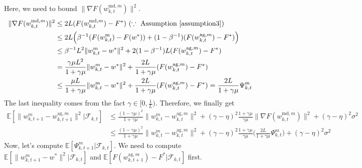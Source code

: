 Here, we need to bound $\|\nabla F(w_{k, t}^{\textrm{md}, m})\|^2$.
\begin{align} \label{ineq3.5-2}
    \|\nabla F(w_{k, t}^{\textrm{md}, m})\|^2 &\leq 2L(F(w_{k, t}^{\textrm{md}, m}) - F^*) \textrm{ }(\because \textrm{ Assumption \ref{assumption3}}) \nonumber\\
    &\leq 2L\Big(\beta^{-1}(F(w_{k, t}^m)-F(w^*))+(1-\beta^{-1})(F(w_{k, t}^{\textrm{ag}, m})-F^*)\Big) \nonumber\\
    &\leq \beta^{-1}L^2 \|w_{k, t}^m - w^*\|^2 + 2(1-\beta^{-1})L(F(w_{k, t}^{\textrm{ag}, m})-F^*) \nonumber\\
    &= \frac{\gamma\mu L^2}{1+\gamma\mu}\|w_{k, t}^m - w^*\|^2 + \frac{2L}{1+\gamma\mu}(F(w_{k, t}^{\textrm{ag}, m})-F^*) \nonumber\\
    &\leq \frac{\mu L}{1+\gamma\mu}\|w_{k, t}^m - w^*\|^2 + \frac{2L}{1+\gamma\mu}(F(w_{k, t}^{\textrm{ag}, m})-F^*) = \frac{2L}{1+\gamma\mu}\Psi_{k, t}^m
\end{align}
The last inequality comes from the fact $\gamma \in [0, \frac{1}{L})$. Therefore, we finally get
\begin{align} \label{ineq3.5-3}
    \mathbb{E}[\|w_{k, t+1}^m - w_{k, t+1}^{\textrm{ag}, m}\|^2|\mathcal{F}_{k, t}] &\leq \frac{(1-\gamma\mu)^2}{1+\gamma\mu}\|w_{k, t}^m - w_{k, t}^{\textrm{ag}, m}\|^2 + (\gamma-\eta)^2\frac{1+\gamma\mu}{\gamma\mu}\|\nabla F(w_{k, t}^{\textrm{md}, m})\|^2 + (\gamma-\eta)^2\sigma^2 \nonumber\\
    &\leq \frac{(1-\gamma\mu)^2}{1+\gamma\mu}\|w_{k, t}^m - w_{k, t}^{\textrm{ag}, m}\|^2 + (\gamma-\eta)^2\frac{1+\gamma\mu}{\gamma\mu}\Big(\frac{2L}{1+\gamma\mu}\Psi_{k, t}^m\Big) + (\gamma-\eta)^2\sigma^2
\end{align}
Now, let's compute $\mathbb{E}[\Psi_{k, t+1}^m|\mathcal{F}_{k, t}]$. We need to compute $\mathbb{E}[\|w_{k, t+1}^m-w^*\|^2|\mathcal{F}_{k, t}]$ and $\mathbb{E}[F(w_{k, t+1}^{\textrm{ag}, m}) - F^*|\mathcal{F}_{k, t}]$ first.
